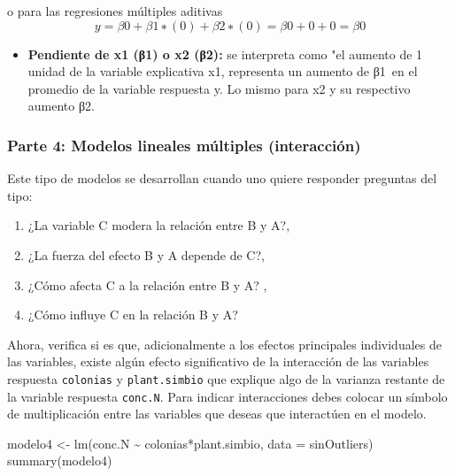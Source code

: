 \documentclass[
]{article}
\newenvironment{Shaded}{}{}
\newcommand{\AttributeTok}[1]{\textcolor[rgb]{0.49,0.56,0.16}{#1}}
\newcommand{\FunctionTok}[1]{\textcolor[rgb]{0.02,0.16,0.49}{#1}}
\newcommand{\NormalTok}[1]{#1}
\newcommand{\OtherTok}[1]{\textcolor[rgb]{0.00,0.44,0.13}{#1}}
\newcommand{\SpecialCharTok}[1]{\textcolor[rgb]{0.25,0.44,0.63}{#1}}
\providecommand{\tightlist}{%
  \setlength{\itemsep}{0pt}\setlength{\parskip}{0pt}}
\begin{document}
o para las regresiones múltiples aditivas\[
y=β0+β1∗(0)+β2∗(0) = β0+0+0 = β0  
\]

\begin{itemize}
\tightlist
\item
  \textbf{Pendiente de x1 (β1) o x2 (β2):} se interpreta como "el
  aumento de 1 unidad de la variable explicativa x1, representa un
  aumento de β1~en el promedio de la variable respuesta y. Lo mismo para
  x2 y su respectivo aumento β2.
\end{itemize}

\hypertarget{parte-4-modelos-lineales-muxfaltiples-interacciuxf3n}{%
\subsubsection{\texorpdfstring{\textbf{Parte 4: Modelos lineales
múltiples
(interacción)}}{Parte 4: Modelos lineales múltiples (interacción)}}\label{parte-4-modelos-lineales-muxfaltiples-interacciuxf3n}}

Este tipo de modelos se desarrollan cuando uno quiere responder
preguntas del tipo:

\begin{enumerate}
\def\labelenumi{\arabic{enumi}.}
\item
  ¿La variable C modera la relación entre B y A?,
\item
  ¿La fuerza del efecto B y A depende de C?,
\item
  ¿Cómo afecta C a la relación entre B y A? ,
\item
  ¿Cómo influye C en la relación B y A?
\end{enumerate}

Ahora, verifica si es que, adicionalmente a los efectos principales
individuales de las variables, existe algún efecto significativo de la
interacción de las variables respuesta \texttt{colonias} y
\texttt{plant.simbio} que explique algo de la varianza restante de la
variable respuesta \texttt{conc.N}. Para indicar interacciones debes
colocar un símbolo de multiplicación entre las variables que deseas que
interactúen en el modelo.

\begin{Shaded}
\begin{Highlighting}[]
\NormalTok{modelo4 }\OtherTok{\textless{}{-}} \FunctionTok{lm}\NormalTok{(conc.N }\SpecialCharTok{\textasciitilde{}}\NormalTok{ colonias}\SpecialCharTok{*}\NormalTok{plant.simbio, }\AttributeTok{data =}\NormalTok{ sinOutliers)}
\FunctionTok{summary}\NormalTok{(modelo4)}
\end{Highlighting}
\end{Shaded}
\end{document}
